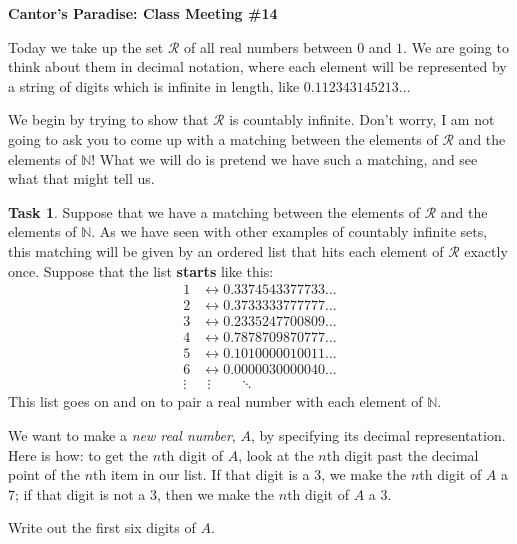 \documentclass[12pt]{amsart}
\theoremstyle{definition}
\newtheorem{task}{Task}
\begin{document}
\begin{center}
\textbf{\Huge
Cantor's Paradise: Class Meeting \#14
}
\end{center}


\vspace{.5in}

Today we take up  the set $\mathcal{R}$ of all real numbers between $0$ and $1$.
We are going to think about them in decimal notation, where each element will be represented by a string of digits which is infinite in length, like $0.112343145213\ldots$

We begin by trying to show that $\mathcal{R}$ is countably infinite.
Don't worry, I am not going to ask you to come up with a matching between the elements of $\mathcal{R}$ and the elements of $\mathbb{N}$!
What we will do is pretend we have such a matching, and see what that might tell us.

\begin{task}
Suppose that we have a matching between the elements of $\mathcal{R}$ and the elements of $\mathbb{N}$.
As we have seen with other examples of countably infinite sets, this matching will be given by an ordered list that hits each element of $\mathcal{R}$ exactly once.
Suppose that the list \textbf{starts} like this:
\begin{align*}
1 & \leftrightarrow  0.3374543377733 \dots \\
2 & \leftrightarrow  0.3733333777777 \dots \\
3 & \leftrightarrow  0.2335247700809 \dots \\
4 & \leftrightarrow  0.7878709870777 \dots \\
5 & \leftrightarrow  0.1010000010011 \dots \\
6 & \leftrightarrow  0.0000030000040 \dots \\
\vdots & \ \ \vdots  \qquad \ddots
\end{align*}
This list goes on and on to pair a real number with each element of $\mathbb{N}$.

We want to make a \emph{new real number}, $A$, by specifying its decimal representation.
Here is how: to get the $n$th digit of $A$, look at the $n$th digit past the decimal point of the $n$th item in our list.
If that digit is a $3$, we make the $n$th digit of $A$ a $7$; if that digit is not a $3$, then we make the $n$th digit of $A$ a $3$.

Write out the first six digits of $A$.

\end{task}
\end{document}
